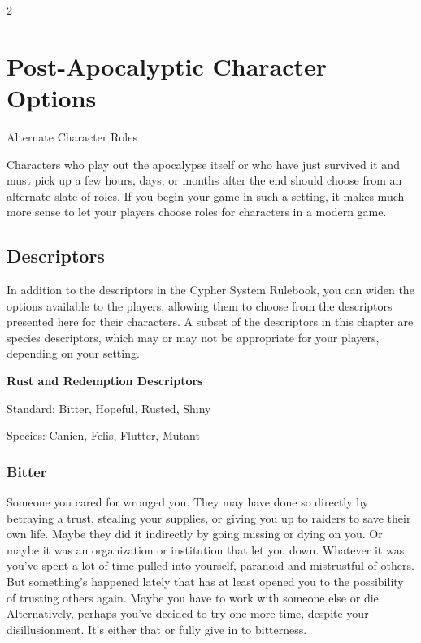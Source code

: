 \begin{multicols}{2}

\chapter{Post-Apocalyptic Character Options}

Alternate Character Roles

Characters who play out the apocalypse itself or who have just survived it and must pick up a few hours, days, or months after the end should choose from an alternate slate of roles. If you begin your game in such a setting, it makes much more sense to let your players choose roles for characters in a modern game.

\section{Descriptors}

In addition to the descriptors in the Cypher System Rulebook, you can widen the options available to the players, allowing them to choose from the descriptors presented here for their characters. A subset of the descriptors in this chapter are species descriptors, which may or may not be appropriate for your players, depending on your setting.

\textbf{Rust and Redemption Descriptors}

Standard: Bitter, Hopeful, Rusted, Shiny

Species: Canien, Felis, Flutter, Mutant

\subsection{Bitter}

Someone you cared for wronged you. They may have done so directly by betraying a trust, stealing your supplies, or giving you up to raiders to save their own life. Maybe they did it indirectly by going missing or dying on you. Or maybe it was an organization or institution that let you down. Whatever it was, you’ve spent a lot of time pulled into yourself, paranoid and mistrustful of others. But something’s happened lately that has at least opened you to the possibility of trusting others again. Maybe you have to work with someone else or die. Alternatively, perhaps you’ve decided to try one more time, despite your disillusionment. It’s either that or fully give in to bitterness.


\end{multicols}
